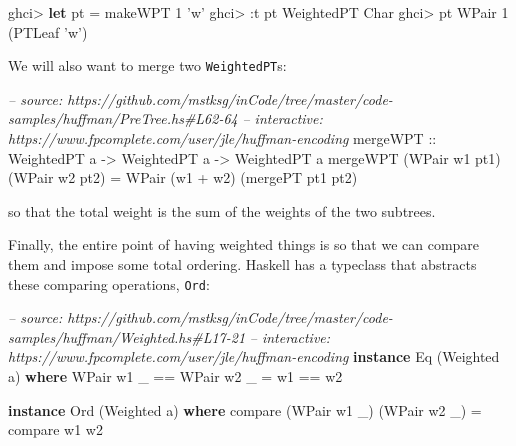 \documentclass[]{article}
\newenvironment{Shaded}{}{}
\newcommand{\KeywordTok}[1]{\textcolor[rgb]{0.00,0.44,0.13}{\textbf{{#1}}}}
\newcommand{\DataTypeTok}[1]{\textcolor[rgb]{0.56,0.13,0.00}{{#1}}}
\newcommand{\DecValTok}[1]{\textcolor[rgb]{0.25,0.63,0.44}{{#1}}}
\newcommand{\CharTok}[1]{\textcolor[rgb]{0.25,0.44,0.63}{{#1}}}
\newcommand{\CommentTok}[1]{\textcolor[rgb]{0.38,0.63,0.69}{\textit{{#1}}}}
\newcommand{\OtherTok}[1]{\textcolor[rgb]{0.00,0.44,0.13}{{#1}}}
\newcommand{\FunctionTok}[1]{\textcolor[rgb]{0.02,0.16,0.49}{{#1}}}
\newcommand{\NormalTok}[1]{{#1}}
\begin{document}
\begin{Shaded}
\begin{Highlighting}[]
\NormalTok{ghci}\FunctionTok{>} \KeywordTok{let} \NormalTok{pt }\FunctionTok{=} \NormalTok{makeWPT }\DecValTok{1} \CharTok{'w'}
\NormalTok{ghci}\FunctionTok{>} \FunctionTok{:}\NormalTok{t pt}
\DataTypeTok{WeightedPT} \DataTypeTok{Char}
\NormalTok{ghci}\FunctionTok{>} \NormalTok{pt}
\DataTypeTok{WPair} \DecValTok{1} \NormalTok{(}\DataTypeTok{PTLeaf} \CharTok{'w'}\NormalTok{)}
\end{Highlighting}
\end{Shaded}

We will also want to merge two \texttt{WeightedPT}s:

\begin{Shaded}
\begin{Highlighting}[]
\CommentTok{-- source: https://github.com/mstksg/inCode/tree/master/code-samples/huffman/PreTree.hs#L62-64}
\CommentTok{-- interactive: https://www.fpcomplete.com/user/jle/huffman-encoding}
\OtherTok{mergeWPT ::} \DataTypeTok{WeightedPT} \NormalTok{a }\OtherTok{->} \DataTypeTok{WeightedPT} \NormalTok{a }\OtherTok{->} \DataTypeTok{WeightedPT} \NormalTok{a}
\NormalTok{mergeWPT (}\DataTypeTok{WPair} \NormalTok{w1 pt1) (}\DataTypeTok{WPair} \NormalTok{w2 pt2)}
    \FunctionTok{=} \DataTypeTok{WPair} \NormalTok{(w1 }\FunctionTok{+} \NormalTok{w2) (mergePT pt1 pt2)}
\end{Highlighting}
\end{Shaded}

so that the total weight is the sum of the weights of the two subtrees.

Finally, the entire point of having weighted things is so that we can compare
them and impose some total ordering. Haskell has a typeclass that abstracts
these comparing operations, \texttt{Ord}:

\begin{Shaded}
\begin{Highlighting}[]
\CommentTok{-- source: https://github.com/mstksg/inCode/tree/master/code-samples/huffman/Weighted.hs#L17-21}
\CommentTok{-- interactive: https://www.fpcomplete.com/user/jle/huffman-encoding}
\KeywordTok{instance} \DataTypeTok{Eq} \NormalTok{(}\DataTypeTok{Weighted} \NormalTok{a) }\KeywordTok{where}
    \DataTypeTok{WPair} \NormalTok{w1 _ }\FunctionTok{==} \DataTypeTok{WPair} \NormalTok{w2 _ }\FunctionTok{=} \NormalTok{w1 }\FunctionTok{==} \NormalTok{w2}

\KeywordTok{instance} \DataTypeTok{Ord} \NormalTok{(}\DataTypeTok{Weighted} \NormalTok{a) }\KeywordTok{where}
    \NormalTok{compare (}\DataTypeTok{WPair} \NormalTok{w1 _) (}\DataTypeTok{WPair} \NormalTok{w2 _) }\FunctionTok{=} \NormalTok{compare w1 w2}
\end{Highlighting}
\end{Shaded}
\end{document}
